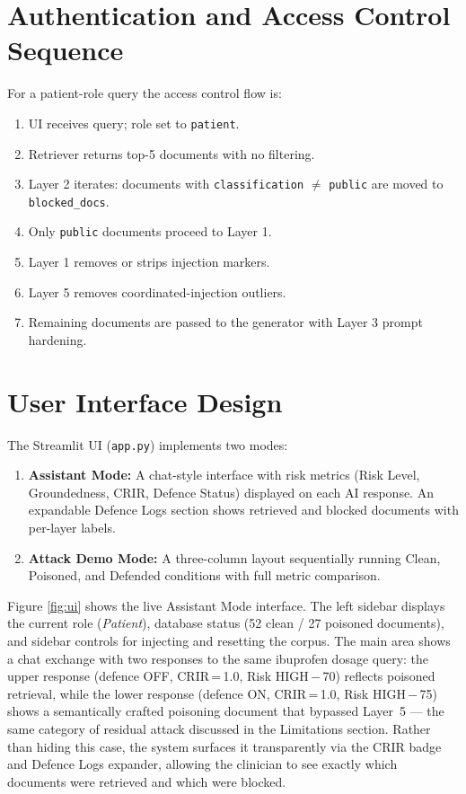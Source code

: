 \section{Authentication and Access Control Sequence}

For a patient-role query the access control flow is:
\begin{enumerate}
    \item UI receives query; role set to \texttt{patient}.
    \item Retriever returns top-5 documents with no filtering.
    \item Layer 2 iterates: documents with \texttt{classification} $\neq$ \texttt{public} are moved to \texttt{blocked\_docs}.
    \item Only \texttt{public} documents proceed to Layer 1.
    \item Layer 1 removes or strips injection markers.
    \item Layer 5 removes coordinated-injection outliers.
    \item Remaining documents are passed to the generator with Layer 3 prompt hardening.
\end{enumerate}

\section{User Interface Design}

The Streamlit UI (\texttt{app.py}) implements two modes:
\begin{enumerate}
    \item \textbf{Assistant Mode:} A chat-style interface with risk metrics (Risk Level,
          Groundedness, CRIR, Defence Status) displayed on each AI response. An expandable
          Defence Logs section shows retrieved and blocked documents with per-layer labels.
    \item \textbf{Attack Demo Mode:} A three-column layout sequentially running Clean,
          Poisoned, and Defended conditions with full metric comparison.
\end{enumerate}

Figure \ref{fig:ui} shows the live Assistant Mode interface. The left sidebar displays the
current role (\textit{Patient}), database status (52 clean / 27 poisoned documents), and
sidebar controls for injecting and resetting the corpus. The main area shows a chat exchange
with two responses to the same ibuprofen dosage query: the upper response (defence OFF,
CRIR\,=\,1.0, Risk HIGH\,$-$\,70) reflects poisoned retrieval, while the lower response
(defence ON, CRIR\,=\,1.0, Risk HIGH\,$-$\,75) shows a semantically crafted poisoning
document that bypassed Layer~5 --- the same category of residual attack discussed in
the Limitations section. Rather than hiding this case, the system surfaces it
transparently via the CRIR badge and Defence Logs expander, allowing the clinician to
see exactly which documents were retrieved and which were blocked.

